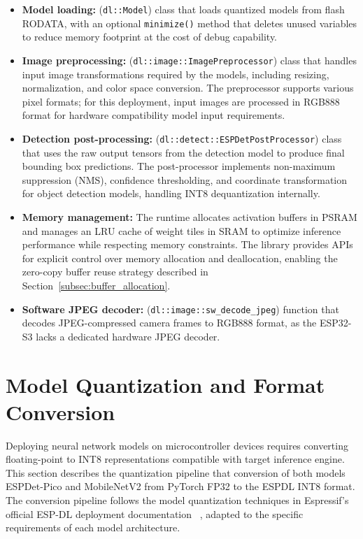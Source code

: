\begin{itemize}
    \item \textbf{Model loading:} (\texttt{dl::Model}) class that loads quantized models from flash RODATA, with an optional \texttt{minimize()} method that deletes unused variables to reduce memory footprint at the cost of debug capability.
    \item \textbf{Image preprocessing:}  (\texttt{dl::image::ImagePreprocessor}) class that handles input image transformations required by the models, including resizing, normalization, and color space conversion. The preprocessor supports various pixel formats; for this deployment, input images are processed in RGB888 format for hardware compatibility model input requirements.
    \item \textbf{Detection post-processing:} (\texttt{dl::detect::ESPDetPostProcessor}) class that uses the raw output tensors from the detection model to produce final bounding box predictions. The post-processor implements non-maximum suppression (NMS), confidence thresholding, and coordinate transformation for object detection models, handling INT8 dequantization internally.
    \item \textbf{Memory management:} The runtime allocates activation buffers in PSRAM and manages an LRU cache of weight tiles in SRAM to optimize inference performance while respecting memory constraints. The library provides APIs for explicit control over memory allocation and deallocation, enabling the zero-copy buffer reuse strategy described in Section~\ref{subsec:buffer_allocation}.
    \item \textbf{Software JPEG decoder:} (\texttt{dl::image::sw\_decode\_jpeg}) function that decodes JPEG-compressed camera frames to RGB888 format, as the ESP32-S3 lacks a dedicated hardware JPEG decoder.

\end{itemize}


\section{Model Quantization and Format Conversion}
\label{sec:quantization_pipeline}

Deploying neural network models on microcontroller devices requires converting floating-point to INT8 representations compatible with target inference engine. This section describes the quantization pipeline that conversion of both models ESPDet-Pico and MobileNetV2 from PyTorch FP32 to the ESPDL INT8 format. The conversion pipeline follows the model quantization techniques in Espressif's official ESP-DL deployment documentation ~\cite{esp_dl_mobilenetv2_tutorial}, adapted to the specific requirements of each model architecture. 

